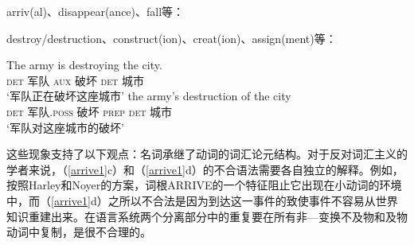 \begin{exe}\ex
\label{arrive1} 
arriv(al)、disappear(ance)、fall等：
\begin{xlist}[iv.]
\zl

\begin{exe}\ex
\label{trans}
destroy/destruction、construct(ion)、creat(ion)、assign(ment)等：
\begin{xlist}[iv.]
\ex 
\gll The army is destroying the city.\\
     \textsc{det} 军队 \textsc{aux} 破坏 \textsc{det} 城市\\
\glt `军队正在破坏这座城市'
\ex 
\gll the army's destruction of the city\\
     \textsc{det} 军队.\textsc{poss} 破坏 \textsc{prep} \textsc{det} 城市\\
\glt `军队对这座城市的破坏'
\zl

\noindent
这些现象支持了以下观点：名词承继了动词的词汇论元结构。对于反对词汇主义的学者来说，（\ref{arrive1}c）和（\ref{arrive1}d）的不合语法需要各自独立的解释。例如，按照Harley和Noyer\citeyear{HN2000a}的方案，词根ARRIVE的一个特征阻止它出现在小动词的环境中，而（\ref{arrive1}d）之所以不合法是因为到达这一事件的致使事件不容易从世界知识重建出来。在语言系统两个分离部分中的重复要在所有非—变换不及物和及物动词中复制，是很不合理的。


\end{xlist}
\end{exe}
\end{xlist}
\end{exe}
